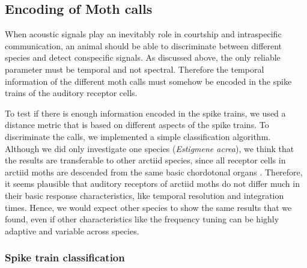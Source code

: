 \documentclass[12pt,a4paper]{article}
\newcommand{\species}[1]{\textit{#1}}
\begin{document}
\subsection{Encoding of Moth calls}
When acoustic signals play an inevitably role in courtship and intraspecific communication, an animal should be able to discriminate between different species and detect conspecific signals. As discussed above, the only reliable parameter must be temporal and not spectral. Therefore the temporal information of the different moth calls must somehow be encoded in the spike trains of the auditory receptor cells. 

To test if there is enough information encoded in the spike trains, we used a distance metric that is based on different aspects of the spike trains. To discriminate the calls, we implemented a simple classification algorithm. Although we did only investigate one species (\species{Estigmene acrea}), we think that the results are transferable to other arctiid species, since all receptor cells in arctiid moths are descended from the same basic chordotonal organs \cite{yack2004}. Therefore, it seems plausible that auditory receptors of arctiid moths do not differ much in their basic response characteristics, like temporal resolution and integration times. Hence, we would expect other species to show the same results that we found, even if other characteristics like the frequency tuning can be highly adaptive and variable across species.


\subsubsection{Spike train classification}
\end{document}
